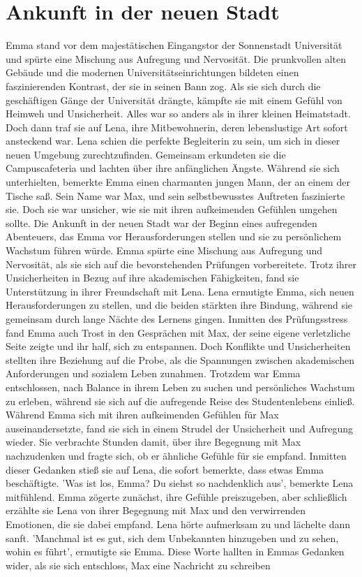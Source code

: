 \documentclass[12pt]{article} %
\begin{document}
\clearpage
\tableofcontents
\clearpage


\section{ Ankunft in der neuen Stadt }
 Emma stand vor dem majestätischen Eingangstor der Sonnenstadt Universität und spürte eine Mischung aus Aufregung und Nervosität. Die prunkvollen alten Gebäude und die modernen Universitätseinrichtungen bildeten einen faszinierenden Kontrast, der sie in seinen Bann zog. Als sie sich durch die geschäftigen Gänge der Universität drängte, kämpfte sie mit einem Gefühl von Heimweh und Unsicherheit. Alles war so anders als in ihrer kleinen Heimatstadt. Doch dann traf sie auf Lena, ihre Mitbewohnerin, deren lebenslustige Art sofort ansteckend war. Lena schien die perfekte Begleiterin zu sein, um sich in dieser neuen Umgebung zurechtzufinden. Gemeinsam erkundeten sie die Campuscafeteria und lachten über ihre anfänglichen Ängste. Während sie sich unterhielten, bemerkte Emma einen charmanten jungen Mann, der an einem der Tische saß. Sein Name war Max, und sein selbstbewusstes Auftreten faszinierte sie. Doch sie war unsicher, wie sie mit ihren aufkeimenden Gefühlen umgehen sollte. Die Ankunft in der neuen Stadt war der Beginn eines aufregenden Abenteuers, das Emma vor Herausforderungen stellen und sie zu persönlichem Wachstum führen würde. Emma spürte eine Mischung aus Aufregung und Nervosität, als sie sich auf die bevorstehenden Prüfungen vorbereitete. Trotz ihrer Unsicherheiten in Bezug auf ihre akademischen Fähigkeiten, fand sie Unterstützung in ihrer Freundschaft mit Lena. Lena ermutigte Emma, sich neuen Herausforderungen zu stellen, und die beiden stärkten ihre Bindung, während sie gemeinsam durch lange Nächte des Lernens gingen. Inmitten des Prüfungsstress fand Emma auch Trost in den Gesprächen mit Max, der seine eigene verletzliche Seite zeigte und ihr half, sich zu entspannen. Doch Konflikte und Unsicherheiten stellten ihre Beziehung auf die Probe, als die Spannungen zwischen akademischen Anforderungen und sozialem Leben zunahmen. Trotzdem war Emma entschlossen, nach Balance in ihrem Leben zu suchen und persönliches Wachstum zu erleben, während sie sich auf die aufregende Reise des Studentenlebens einließ. Während Emma sich mit ihren aufkeimenden Gefühlen für Max auseinandersetzte, fand sie sich in einem Strudel der Unsicherheit und Aufregung wieder. Sie verbrachte Stunden damit, über ihre Begegnung mit Max nachzudenken und fragte sich, ob er ähnliche Gefühle für sie empfand. Inmitten dieser Gedanken stieß sie auf Lena, die sofort bemerkte, dass etwas Emma beschäftigte. 'Was ist los, Emma? Du siehst so nachdenklich aus', bemerkte Lena mitfühlend. Emma zögerte zunächst, ihre Gefühle preiszugeben, aber schließlich erzählte sie Lena von ihrer Begegnung mit Max und den verwirrenden Emotionen, die sie dabei empfand. Lena hörte aufmerksam zu und lächelte dann sanft. 'Manchmal ist es gut, sich dem Unbekannten hinzugeben und zu sehen, wohin es führt', ermutigte sie Emma. Diese Worte hallten in Emmas Gedanken wider, als sie sich entschloss, Max eine Nachricht zu schreiben 
\end{document}

